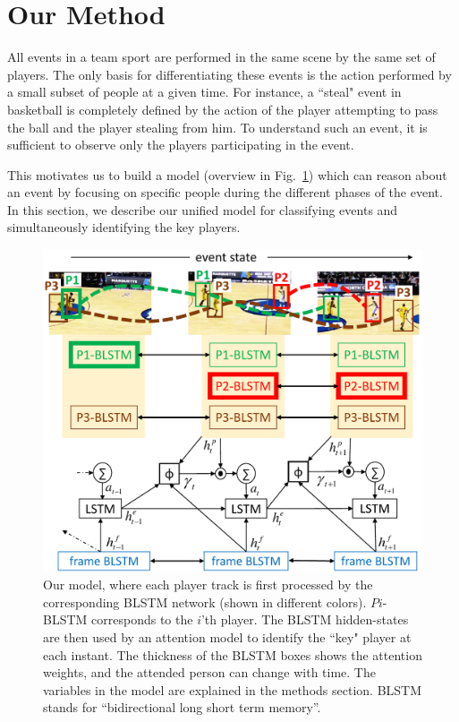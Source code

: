 \section{Our Method}
\label{sec:methods}

All events in a team sport are performed in the same scene by the same set of
players. The only basis for differentiating these events is the action
performed by a small subset of people at a given time.  For instance, a
``steal" event in basketball is completely defined by the action of the player
attempting to pass the ball and the player stealing from him.  To understand
such an event, it is sufficient to observe only the players participating in
the event.

This motivates us to build a model (overview in Fig.~\ref{fig:model})
which can reason about an event by focusing
on specific people during the different phases of the event.
In this section, we describe our unified model for classifying events
and simultaneously identifying the key players.

\begin{figure}[t!]
\begin{center}
    \includegraphics[width=3 in]{images/system_figure_4_cropped.pdf}
\end{center}
   \caption{Our model, where each player track is first processed by the
     corresponding BLSTM network (shown in different colors).  $Pi$-BLSTM
     corresponds to the $i$'th player.  The BLSTM hidden-states are then used
     by an attention model to identify the ``key" player at each instant.  The
     thickness of the BLSTM boxes shows the attention weights, and the attended
     person can change with time.  The variables in the model are explained in
     the methods section.  BLSTM stands for ``bidirectional long short term
   memory''. }
\label{fig:model}
\end{figure}

